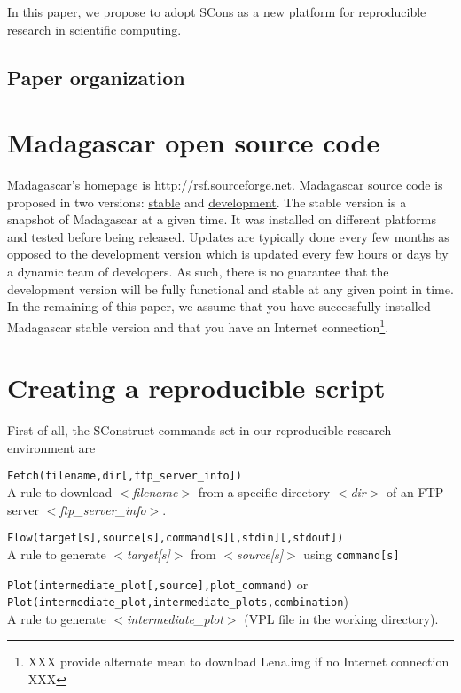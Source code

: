 In this paper, we propose to adopt SCons as a new platform for
reproducible research in scientific computing.

\subsection{Paper organization}

\newpage
\section{Madagascar open source code}
%
Madagascar's homepage is \url{http://rsf.sourceforge.net}. Madagascar
source code is proposed in two versions:
\href{https://sourceforge.net/project/showfiles.php?group_id=162909}{stable}
and
\href{http://rsf.sourceforge.net/wiki/index.php/Svn-url}{development}.
The stable version is a snapshot of Madagascar at a given time. It was
installed on different platforms and tested before being released.
Updates are typically done every few months as opposed to the
development version which is updated every few hours or days by a
dynamic team of developers. As such, there is no guarantee that the
development version will be fully functional and stable at any given
point in time. In the remaining of this paper, we assume that you have
successfully installed Madagascar stable version and that you have an
Internet connection\footnote{XXX provide alternate mean to download
  Lena.img if no Internet connection XXX}.

\section{Creating a reproducible script}
%
First of all, the SConstruct commands set in our reproducible research
environment are

\noindent\texttt{Fetch(filename,dir[,ftp\_server\_info])}\\
\indent A rule to download \textit{$<$filename$>$} from a specific
directory \textit{$<$dir$>$} of an FTP server
\textit{$<$ftp\_server\_info$>$}.

\noindent\texttt{Flow(target[s],source[s],command[s][,stdin][,stdout])}\\
\indent A rule to generate \textit{$<$target[s]$>$} from
\textit{$<$source[s]$>$} using \texttt{command[s]}

\noindent\texttt{Plot(intermediate\_plot[,source],plot\_command)} or\\
\texttt{Plot(intermediate\_plot,intermediate\_plots,combination})\\
\indent A rule to generate \textit{$<$intermediate\_plot$>$} (VPL file
in the working directory).


